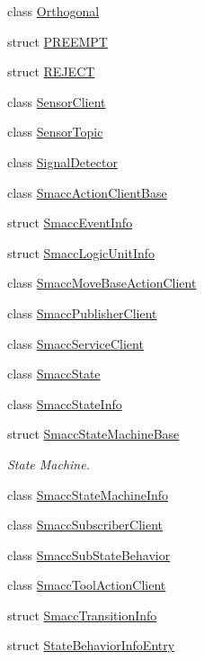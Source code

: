 \begin{DoxyCompactItemize}
class \hyperlink{classsmacc_1_1Orthogonal}{Orthogonal}
\item 
struct \hyperlink{structsmacc_1_1PREEMPT}{P\+R\+E\+E\+M\+PT}
\item 
struct \hyperlink{structsmacc_1_1REJECT}{R\+E\+J\+E\+CT}
\item 
class \hyperlink{classsmacc_1_1SensorClient}{Sensor\+Client}
\item 
class \hyperlink{classsmacc_1_1SensorTopic}{Sensor\+Topic}
\item 
class \hyperlink{classsmacc_1_1SignalDetector}{Signal\+Detector}
\item 
class \hyperlink{classsmacc_1_1SmaccActionClientBase}{Smacc\+Action\+Client\+Base}
\item 
struct \hyperlink{structsmacc_1_1SmaccEventInfo}{Smacc\+Event\+Info}
\item 
struct \hyperlink{structsmacc_1_1SmaccLogicUnitInfo}{Smacc\+Logic\+Unit\+Info}
\item 
class \hyperlink{classsmacc_1_1SmaccMoveBaseActionClient}{Smacc\+Move\+Base\+Action\+Client}
\item 
class \hyperlink{classsmacc_1_1SmaccPublisherClient}{Smacc\+Publisher\+Client}
\item 
class \hyperlink{classsmacc_1_1SmaccServiceClient}{Smacc\+Service\+Client}
\item 
class \hyperlink{classsmacc_1_1SmaccState}{Smacc\+State}
\item 
class \hyperlink{classsmacc_1_1SmaccStateInfo}{Smacc\+State\+Info}
\item 
struct \hyperlink{structsmacc_1_1SmaccStateMachineBase}{Smacc\+State\+Machine\+Base}
\begin{DoxyCompactList}\small\item\em State Machine. \end{DoxyCompactList}\item 
class \hyperlink{classsmacc_1_1SmaccStateMachineInfo}{Smacc\+State\+Machine\+Info}
\item 
class \hyperlink{classsmacc_1_1SmaccSubscriberClient}{Smacc\+Subscriber\+Client}
\item 
class \hyperlink{classsmacc_1_1SmaccSubStateBehavior}{Smacc\+Sub\+State\+Behavior}
\item 
class \hyperlink{classsmacc_1_1SmaccToolActionClient}{Smacc\+Tool\+Action\+Client}
\item 
struct \hyperlink{structsmacc_1_1SmaccTransitionInfo}{Smacc\+Transition\+Info}
\item 
struct \hyperlink{structsmacc_1_1StateBehaviorInfoEntry}{State\+Behavior\+Info\+Entry}

\end{DoxyCompactItemize}

